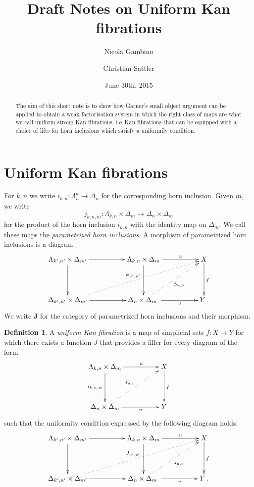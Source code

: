 \documentclass[reqno,10pt,a4paper,oneside]{amsart}
\author[]{Nicola Gambino}
\author{Christian Sattler}
\title[]{Draft Notes on Uniform Kan fibrations}
\date{June 30th, 2015}
\theoremstyle{definition}
\newtheorem{definition}[theorem]{Definition}
\newcommand{\co}{\colon}
\begin{document}
\begin{abstract}
The aim of this short note is to show how Garner's small object argument can be applied to
obtain a weak factorisation system in which the right class of maps are what we
call uniform strong Kan fibrations, i.e.\,Kan fibrations that can be equipped with a choice of lifts for horn
inclusions which satisfy a uniformily condition. 
\end{abstract}


\maketitle
 

 
 
 
\section{Uniform Kan fibrations}

For $k, n$ we write $i_{k,n} \co \Lambda^k_n \to \Delta_n$ for the corresponding horn inclusion. Given 
$m$, we write 
\[
j_{k,n,m} \co \Lambda_{k,n} \times \Delta_m \to \Delta_n \times \Delta_m
\] 
for the 
product of the horn inclusion $i_{k,n}$ with the identity map on $\Delta_m$. We call these maps the
\emph{parametrized horn inclusions}. A morphism of parametrized horn inclusions is a diagram
 \[
\xymatrix@C=1.8cm@R=1.5cm{
 \Lambda_{k',n'} \times \Delta_{m'} \ar[r] \ar[d] &  \Lambda_{k,n} \times \Delta_m \ar[d] \ar[r]^-u & X \ar[d]^{f}  \\
\Delta_{k',n'} \times \Delta_{m'} \ar[r]  \ar@{.>}[urr]^{\phi_{u',v'}} &   \Delta_{n} \times \Delta_{m}  \ar[r]_-v \
 \ar@{.>}[ur]_{\phi_{u,v}}
 & Y \, .}
 \]
 We write $\mathbf{J}$ for the category of parametrized horn inclusions and their morphism.


 
 \begin{definition} A \emph{uniform Kan fibration} is a map of simplicial sets $f \co X \to Y$ 
for which there exists  a function $J$ that provides a filler for every diagram of the form
 \[
\xymatrix@C=1.8cm@R=1.5cm{
 \Lambda_{k,n} \times \Delta_m \ar[r]^-u \ar[d]_{i_{k,n,m}} & X \ar[d]^f \\
 \Delta_{n} \times \Delta_m \ar[r]_-v  \ar@{.>}[ur]^{J_{u,v}}&  Y}
 \]
 such that the uniformity condition  expressed by the following diagram holds:
 \[
\xymatrix@C=1.8cm@R=1.5cm{
 \Lambda_{k',n'} \times \Delta_{m'} \ar[r] \ar[d] &  \Lambda_{k,n} \times \Delta_m \ar[d] \ar[r]^-u & X \ar[d]^{f}  \\
\Delta_{k',n'} \times \Delta_{m'} \ar[r]  \ar@{.>}[urr]^{J_{u',v'}} &   \Delta_{n} \times \Delta_{m}  \ar[r]_-v \
 \ar@{.>}[ur]_{J_{u,v}}
 & Y \, .}
 \]
 \end{definition}
\end{document}
